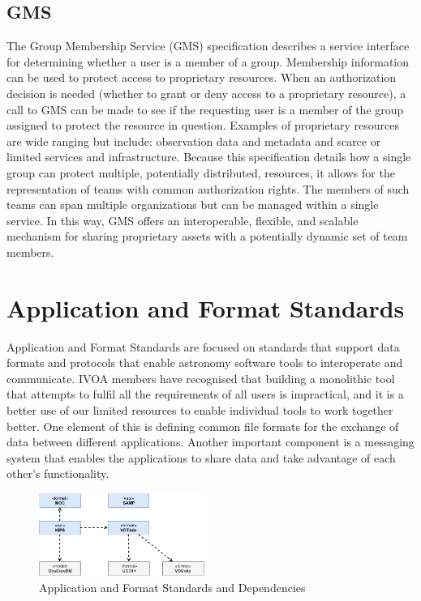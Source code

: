 \documentclass[11pt,letter]{ivoa}
\begin{document}
\subsection{GMS}

The Group Membership Service (GMS) \citep{2022ivoa.spec.0222M}
specification describes a service interface for determining 
whether a user is a member of a group. Membership information can be used to protect access to 
proprietary resources. When an authorization decision is needed (whether to grant or deny access 
to a proprietary resource), a call to GMS can be made to see if the requesting user is a member 
of the group assigned to protect the resource in question. Examples of proprietary resources are 
wide ranging but include: observation data and metadata and scarce or limited services and 
infrastructure. Because this specification details how a single group can protect multiple, 
potentially distributed, resources, it allows for the representation of teams with common 
authorization rights. The members of such teams can span multiple organizations but can be 
managed within a single service. In this way, GMS offers an interoperable, flexible, and 
scalable mechanism for sharing proprietary assets with a potentially dynamic set of team members. 

\section{Application and Format Standards}

Application and Format Standards are focused on standards that support data formats and 
protocols that enable astronomy software tools to interoperate and communicate. IVOA 
members have recognised that building a monolithic tool that attempts to fulfil all the 
requirements of all users is impractical, and it is a better use of our limited resources 
to enable individual tools to work together better. One element of this is defining 
common file formats for the exchange of data between different applications. Another 
important component is a messaging system that enables the applications to share data 
and take advantage of each other's functionality.

\begin{figure}[ht]
\centering
\includegraphics[width=0.48\textwidth]{ivoa-arch-apps.pdf}
\caption{Application and Format Standards and Dependencies}
\label{fig:appsdeps}
\end{figure}
\end{document}
